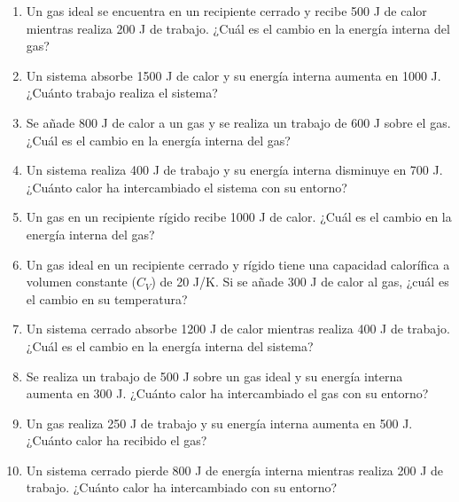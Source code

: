 \documentclass[../main]{subfiles}
\begin{document}
\begin{enumerate}
    \item Un gas ideal se encuentra en un recipiente cerrado y recibe 500 J de calor mientras realiza 200 J de trabajo. ¿Cuál es el cambio en la energía interna del gas?
    \item Un sistema absorbe 1500 J de calor y su energía interna aumenta en 1000 J. ¿Cuánto trabajo realiza el sistema?
    \item Se añade 800 J de calor a un gas y se realiza un trabajo de 600 J sobre el gas. ¿Cuál es el cambio en la energía interna del gas?
    \item Un sistema realiza 400 J de trabajo y su energía interna disminuye en 700 J. ¿Cuánto calor ha intercambiado el sistema con su entorno?
    \item Un gas en un recipiente rígido recibe 1000 J de calor. ¿Cuál es el cambio en la energía interna del gas?
    \item Un gas ideal en un recipiente cerrado y rígido tiene una capacidad calorífica a volumen constante ($C_V$) de 20 J/K. Si se añade 300 J de calor al gas, ¿cuál es el cambio en su temperatura?
    \item Un sistema cerrado absorbe 1200 J de calor mientras realiza 400 J de trabajo. ¿Cuál es el cambio en la energía interna del sistema?
    \item Se realiza un trabajo de 500 J sobre un gas ideal y su energía interna aumenta en 300 J. ¿Cuánto calor ha intercambiado el gas con su entorno?
    \item Un gas realiza 250 J de trabajo y su energía interna aumenta en 500 J. ¿Cuánto calor ha recibido el gas?
    \item Un sistema cerrado pierde 800 J de energía interna mientras realiza 200 J de trabajo. ¿Cuánto calor ha intercambiado con su entorno?
\end{enumerate}
\end{document}
